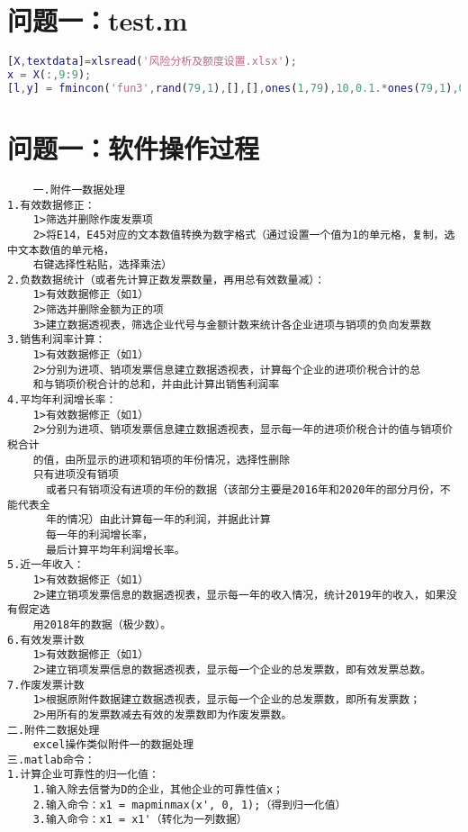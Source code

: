 \documentclass[withoutpreface,bwprint]{cumcmthesis}
\begin{document}
\begin{appendices}
\section{问题一：test.m}
\begin{lstlisting}[language=matlab]
[X,textdata]=xlsread('风险分析及额度设置.xlsx');
x = X(:,9:9);
[l,y] = fmincon('fun3',rand(79,1),[],[],ones(1,79),10,0.1.*ones(79,1),0.01.*x)
\end{lstlisting}

\section{问题一：软件操作过程}
\begin{lstlisting}
    一.附件一数据处理
1.有效数据修正：
	1>筛选并删除作废发票项
    2>将E14，E45对应的文本数值转换为数字格式（通过设置一个值为1的单元格，复制，选中文本数值的单元格，
    右键选择性粘贴，选择乘法）
2.负数数据统计（或者先计算正数发票数量，再用总有效数量减）：
	1>有效数据修正（如1）
	2>筛选并删除金额为正的项
	3>建立数据透视表，筛选企业代号与金额计数来统计各企业进项与销项的负向发票数
3.销售利润率计算：
	1>有效数据修正（如1）
    2>分别为进项、销项发票信息建立数据透视表，计算每个企业的进项价税合计的总
    和与销项价税合计的总和，并由此计算出销售利润率
4.平均年利润增长率：
	1>有效数据修正（如1）
    2>分别为进项、销项发票信息建立数据透视表，显示每一年的进项价税合计的值与销项价税合计
    的值，由所显示的进项和销项的年份情况，选择性删除
    只有进项没有销项
      或者只有销项没有进项的年份的数据（该部分主要是2016年和2020年的部分月份，不能代表全
      年的情况）由此计算每一年的利润，并据此计算
      每一年的利润增长率，
	  最后计算平均年利润增长率。
5.近一年收入：
	1>有效数据修正（如1）
    2>建立销项发票信息的数据透视表，显示每一年的收入情况，统计2019年的收入，如果没有假定选
    用2018年的数据（极少数）。
6.有效发票计数
	1>有效数据修正（如1）
	2>建立销项发票信息的数据透视表，显示每一个企业的总发票数，即有效发票总数。
7.作废发票计数
	1>根据原附件数据建立数据透视表，显示每一个企业的总发票数，即所有发票数；
	2>用所有的发票数减去有效的发票数即为作废发票数。
二.附件二数据处理
	excel操作类似附件一的数据处理
三.matlab命令：
1.计算企业可靠性的归一化值：
	1.输入除去信誉为D的企业，其他企业的可靠性值x；
	2.输入命令：x1 = mapminmax(x', 0, 1);（得到归一化值）
	3.输入命令：x1 = x1'（转化为一列数据）
\end{lstlisting}


\end{appendices}
\end{document}
